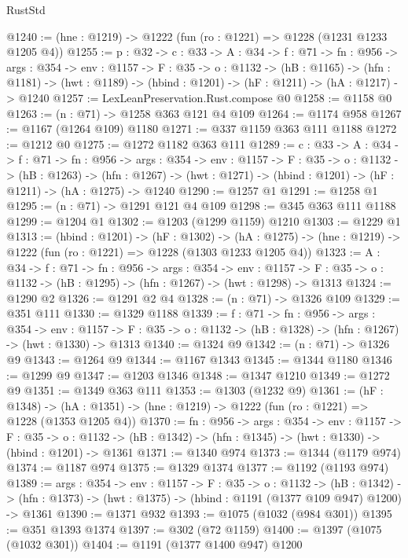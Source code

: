 \begin{lexlean}{RustStd}
\begin{coremodule}
@1240 := (hne : @1219) -> @1222 (fun (ro : @1221) => @1228 (@1231 @1233 @1205 @4))
@1255 := {p : @32} ->
  {c : @33} ->
  {A : @34} ->
  {f : @71} ->
  {fn : @956} ->
  {args : @354} ->
  {env : @1157} ->
  {F : @35} ->
  {o : @1132} ->
  (hB : @1165) ->
  (hfn : @1181) -> (hwt : @1189) -> (hbind : @1201) -> (hF : @1211) -> (hA : @1217) -> @1240
@1257 := LexLeanPreservation.Rust.compose @0
@1258 := @1158 @0
@1263 := (n : @71) -> @1258 @363 @121 @4 @109
@1264 := @1174 @958
@1267 := @1167 (@1264 @109) @1180
@1271 := @337 @1159 @363 @111 @1188
@1272 := @1212 @0
@1275 := @1272 @1182 @363 @111
@1289 := {c : @33} ->
  {A : @34} ->
  {f : @71} ->
  {fn : @956} ->
  {args : @354} ->
  {env : @1157} ->
  {F : @35} ->
  {o : @1132} ->
  (hB : @1263) ->
  (hfn : @1267) -> (hwt : @1271) -> (hbind : @1201) -> (hF : @1211) -> (hA : @1275) -> @1240
@1290 := @1257 @1
@1291 := @1258 @1
@1295 := (n : @71) -> @1291 @121 @4 @109
@1298 := @345 @363 @111 @1188
@1299 := @1204 @1
@1302 := @1203 (@1299 @1159) @1210
@1303 := @1229 @1
@1313 := (hbind : @1201) ->
  (hF : @1302) ->
  (hA : @1275) -> (hne : @1219) -> @1222 (fun (ro : @1221) => @1228 (@1303 @1233 @1205 @4))
@1323 := {A : @34} ->
  {f : @71} ->
  {fn : @956} ->
  {args : @354} ->
  {env : @1157} ->
  {F : @35} -> {o : @1132} -> (hB : @1295) -> (hfn : @1267) -> (hwt : @1298) -> @1313
@1324 := @1290 @2
@1326 := @1291 @2 @4
@1328 := (n : @71) -> @1326 @109
@1329 := @351 @111
@1330 := @1329 @1188
@1339 := {f : @71} ->
  {fn : @956} ->
  {args : @354} ->
  {env : @1157} ->
  {F : @35} -> {o : @1132} -> (hB : @1328) -> (hfn : @1267) -> (hwt : @1330) -> @1313
@1340 := @1324 @9
@1342 := (n : @71) -> @1326 @9
@1343 := @1264 @9
@1344 := @1167 @1343
@1345 := @1344 @1180
@1346 := @1299 @9
@1347 := @1203 @1346
@1348 := @1347 @1210
@1349 := @1272 @9
@1351 := @1349 @363 @111
@1353 := @1303 (@1232 @9)
@1361 := (hF : @1348) ->
  (hA : @1351) -> (hne : @1219) -> @1222 (fun (ro : @1221) => @1228 (@1353 @1205 @4))
@1370 := {fn : @956} ->
  {args : @354} ->
  {env : @1157} ->
  {F : @35} ->
  {o : @1132} -> (hB : @1342) -> (hfn : @1345) -> (hwt : @1330) -> (hbind : @1201) -> @1361
@1371 := @1340 @974
@1373 := @1344 (@1179 @974)
@1374 := @1187 @974
@1375 := @1329 @1374
@1377 := @1192 (@1193 @974)
@1389 := {args : @354} ->
  {env : @1157} ->
  {F : @35} ->
  {o : @1132} ->
  (hB : @1342) -> (hfn : @1373) -> (hwt : @1375) -> (hbind : @1191 (@1377 @109 @947) @1200) -> @1361
@1390 := @1371 @932
@1393 := @1075 (@1032 (@984 @301))
@1395 := @351 @1393 @1374
@1397 := @302 (@72 @1159)
@1400 := @1397 (@1075 (@1032 @301))
@1404 := @1191 (@1377 @1400 @947) @1200

\end{coremodule}
\end{lexlean}
